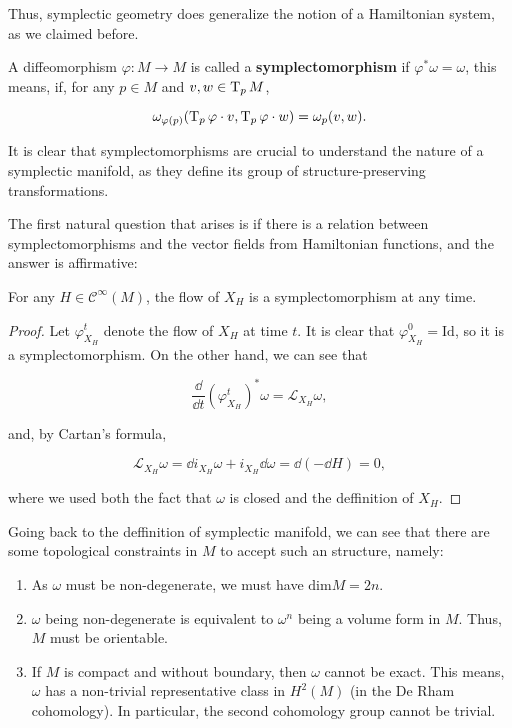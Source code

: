 Thus, symplectic geometry does generalize the notion of a Hamiltonian system, as we claimed before.

\begin{deff}
A diffeomorphism $\varphi : M \rightarrow M$ is called a {\bf symplectomorphism} if $\varphi^{\ast} \omega = \omega$, this means, if, for any $p \in M$ and $v, w \in \operatorname T_pM$,

$$\omega_{\varphi(p)}(\operatorname T_p \varphi \cdot v, \operatorname T_p \varphi \cdot w) = \omega_p(v,w) .$$
\end{deff}

It is clear that symplectomorphisms are crucial to understand the nature of a symplectic manifold, as they define its group of structure-preserving transformations.

The first natural question that arises is if there is a relation between symplectomorphisms and the vector fields from Hamiltonian functions, and the answer is affirmative:

\begin{prop}
For any $H \in \mathcal{C}^{\infty}(M)$, the flow of $X_H$ is a symplectomorphism at any time.
\end{prop}

\begin{proof}
Let $\varphi_{X_H}^t$ denote the flow of $X_H$ at time $t$. It is clear that $\varphi_{X_H}^0 = \text{Id}$, so it is a symplectomorphism. On the other hand, we can see that

$$\frac{\dd}{\dd t} (\varphi_{X_H}^t)^{\ast} \omega = \mathcal{L}_{X_H} \omega ,$$

and, by Cartan's formula,

$$\mathcal{L}_{X_H} \omega = \dd i_{X_H} \omega + i_{X_H} \dd \omega = \dd (- \dd H) = 0 ,$$

where we used both the fact that $\omega$ is closed and the deffinition of $X_H$.
\end{proof}

Going back to the deffinition of symplectic manifold, we can see that there are some topological constraints in $M$ to accept such an structure, namely:

\begin{enumerate}
	\item As $\omega$ must be non-degenerate, we must have $\text{dim}M = 2n$.
	\item $\omega$ being non-degenerate is equivalent to $\omega^n$ being a volume form in $M$. Thus, $M$ must be orientable.
	\item If $M$ is compact and without boundary, then $\omega$ cannot be exact. This means, $\omega$ has a non-trivial representative class in $H^2(M)$ (in the De Rham cohomology). In particular, the second cohomology group cannot be trivial.
\end{enumerate}

